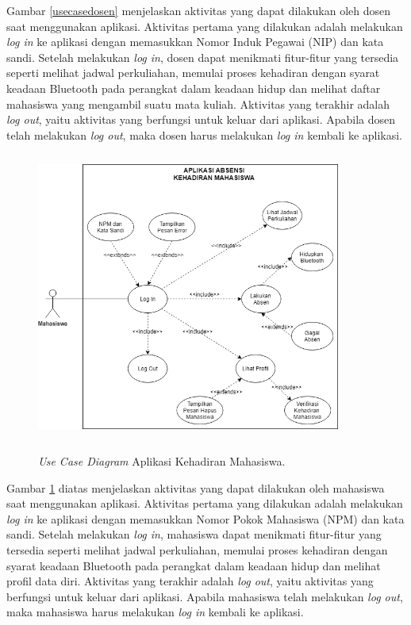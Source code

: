 \par Gambar \ref{usecasedosen} menjelaskan aktivitas yang dapat dilakukan oleh dosen saat menggunakan aplikasi. Aktivitas pertama yang dilakukan adalah melakukan \textit{log in} ke aplikasi dengan memasukkan Nomor Induk Pegawai (NIP) dan kata sandi. Setelah melakukan \textit{log in}, dosen dapat menikmati fitur-fitur yang tersedia seperti melihat jadwal perkuliahan, memulai proses kehadiran dengan syarat keadaan Bluetooth pada perangkat dalam keadaan hidup dan melihat daftar mahasiswa yang mengambil suatu mata kuliah. Aktivitas yang terakhir adalah \textit{log out}, yaitu aktivitas yang berfungsi untuk keluar dari aplikasi. Apabila dosen telah melakukan \textit{log out}, maka dosen harus melakukan \textit{log in} kembali ke aplikasi.

\begin{figure}[H]
	\center
	\shadowbox
	{\includegraphics [width=10cm, height=9.5cm]{gambar/model/use-case-mahasiswa}}
	\caption{\textit{Use Case Diagram} Aplikasi Kehadiran Mahasiswa.}
	\label{usecasemahasiswa}
\end{figure}

\par Gambar \ref{usecasemahasiswa} diatas menjelaskan aktivitas yang dapat dilakukan oleh mahasiswa saat menggunakan aplikasi. Aktivitas pertama yang dilakukan adalah melakukan \textit{log in} ke aplikasi dengan memasukkan Nomor Pokok Mahasiswa (NPM) dan kata sandi. Setelah melakukan \textit{log in}, mahasiswa dapat menikmati fitur-fitur yang tersedia seperti melihat jadwal perkuliahan, memulai proses kehadiran dengan syarat keadaan Bluetooth pada perangkat dalam keadaan hidup dan melihat profil data diri. Aktivitas yang terakhir adalah \textit{log out}, yaitu aktivitas yang berfungsi untuk keluar dari aplikasi. Apabila mahasiswa telah melakukan \textit{log out}, maka mahasiswa harus melakukan \textit{log in} kembali ke aplikasi.

